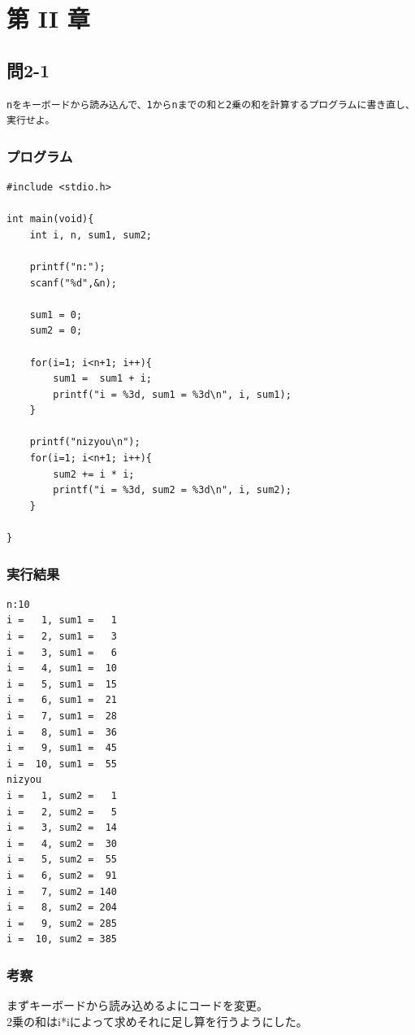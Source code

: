 \documentclass{jarticle}
\begin{document}
\section{第 II 章\\}

\subsection{問2-1\\}
\begin{verbatim}
nをキーボードから読み込んで、1からnまでの和と2乗の和を計算するプログラムに書き直し、実行せよ。
\end{verbatim}
\subsubsection{プログラム\\}
\begin{breakbox}
\begin{verbatim}
#include <stdio.h>

int main(void){
	int i, n, sum1, sum2;

	printf("n:");
	scanf("%d",&n);

	sum1 = 0;
	sum2 = 0;

	for(i=1; i<n+1; i++){
		sum1 =  sum1 + i;
		printf("i = %3d, sum1 = %3d\n", i, sum1);
	}

	printf("nizyou\n");
	for(i=1; i<n+1; i++){
		sum2 += i * i;
		printf("i = %3d, sum2 = %3d\n", i, sum2);
	}

}
\end{verbatim}
\end{breakbox}
\subsubsection{実行結果\\}
\begin{breakbox}
\begin{verbatim}
n:10
i =   1, sum1 =   1
i =   2, sum1 =   3
i =   3, sum1 =   6
i =   4, sum1 =  10
i =   5, sum1 =  15
i =   6, sum1 =  21
i =   7, sum1 =  28
i =   8, sum1 =  36
i =   9, sum1 =  45
i =  10, sum1 =  55
nizyou
i =   1, sum2 =   1
i =   2, sum2 =   5
i =   3, sum2 =  14
i =   4, sum2 =  30
i =   5, sum2 =  55
i =   6, sum2 =  91
i =   7, sum2 = 140
i =   8, sum2 = 204
i =   9, sum2 = 285
i =  10, sum2 = 385
\end{verbatim}
\end{breakbox}
\subsubsection{考察\\}
まずキーボードから読み込めるよにコードを変更。\\
2乗の和はi*iによって求めそれに足し算を行うようにした。\\
\end{document}
